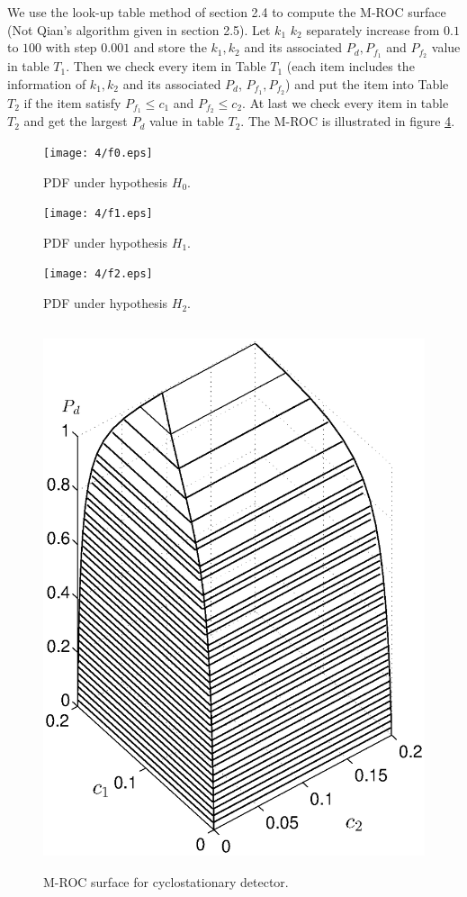 We use the look-up table method of section 2.4 to compute the M-ROC surface (Not Qian's algorithm given in section 2.5).  Let $k_1$ $k_2$ separately increase from $0.1$ to $100$ with step $0.001$ and store the $k_1, k_2$ and its associated $P_d, P_{f_1}$ and $P_{f_2}$ value in table $T_1$. 
Then we check every item in Table $T_1$ (each item includes the information of $k_1, k_2$ and its associated $P_d$, $P_{f_1}, P_{f_2}$) and put the item into Table $T_2$ if the item satisfy $P_{f_1} \leq c_1$ and $P_{f_2} \leq c_2$. At last we check every item in table $T_2$ and get the largest $P_d$ value in table $T_2$.  
The M-ROC is illustrated in figure \ref{pic:1221n0}.  

\begin{figure}[!t]
  \centering 
  \texttt{[image: 4/f0.eps]}
  \caption{PDF under hypothesis $H_0$.}
  \label{pic:1218n0}
\end{figure}
\begin{figure}[!t]
  \centering 
  \texttt{[image: 4/f1.eps]}
  \caption{PDF under hypothesis $H_1$.}
  \label{pic:1218n1}
\end{figure}
\begin{figure}[!t]
  \centering 
  \texttt{[image: 4/f2.eps]}
  \caption{PDF under hypothesis $H_2$.}
  \label{pic:1218n2}
\end{figure}

\begin{figure}[!t]
  \centering 
  \includegraphics[width=12cm, height=16cm]{4/cyclomath.eps}
  \caption{M-ROC surface for cyclostationary detector.}
  \label{pic:1221n0}
\end{figure}
